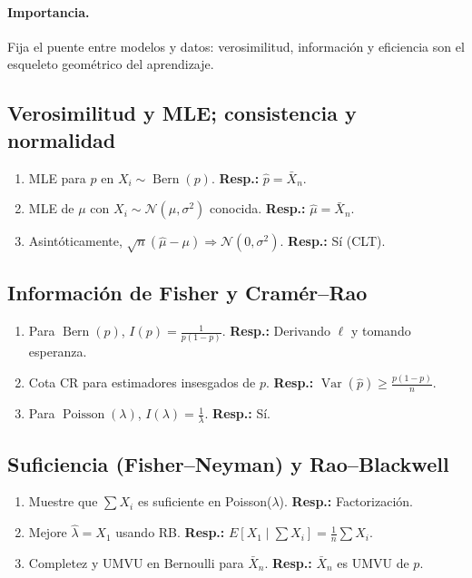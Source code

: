 	\paragraph{Importancia.} Fija el puente entre modelos y datos: verosimilitud, información y eficiencia son el esqueleto geométrico del aprendizaje.
	
	\subsection*{Verosimilitud y MLE; consistencia y normalidad}
	\begin{enumerate}
		\item MLE para $p$ en $X_i\sim\operatorname{Bern}(p)$. \textbf{Resp.:} $\hat p=\bar X_n$.
		\item MLE de $\mu$ con $X_i\sim\mathcal N(\mu,\sigma^2)$ conocida. \textbf{Resp.:} $\hat\mu=\bar X_n$.
		\item Asintóticamente, $\sqrt n(\hat\mu-\mu)\Rightarrow \mathcal N(0,\sigma^2)$. \textbf{Resp.:} Sí (CLT).
	\end{enumerate}
	
	\subsection*{Información de Fisher y Cramér--Rao}
	\begin{enumerate}
		\item Para $\operatorname{Bern}(p)$, $I(p)=\frac{1}{p(1-p)}$. \textbf{Resp.:} Derivando $\ell$ y tomando esperanza.
		\item Cota CR para estimadores insesgados de $p$. \textbf{Resp.:} $\operatorname{Var}(\hat p)\ge \frac{p(1-p)}{n}$.
		\item Para $\operatorname{Poisson}(\lambda)$, $I(\lambda)=\frac{1}{\lambda}$. \textbf{Resp.:} Sí.
	\end{enumerate}
	
	\subsection*{Suficiencia (Fisher--Neyman) y Rao--Blackwell}
	\begin{enumerate}
		\item Muestre que $\sum X_i$ es suficiente en Poisson($\lambda$). \textbf{Resp.:} Factorización.
		\item Mejore $\hat\lambda=X_1$ usando RB. \textbf{Resp.:} $E[X_1\mid \sum X_i]=\tfrac{1}{n}\sum X_i$.
		\item Completez y UMVU en Bernoulli para $\bar X_n$. \textbf{Resp.:} $\bar X_n$ es UMVU de $p$.
	\end{enumerate}
	
